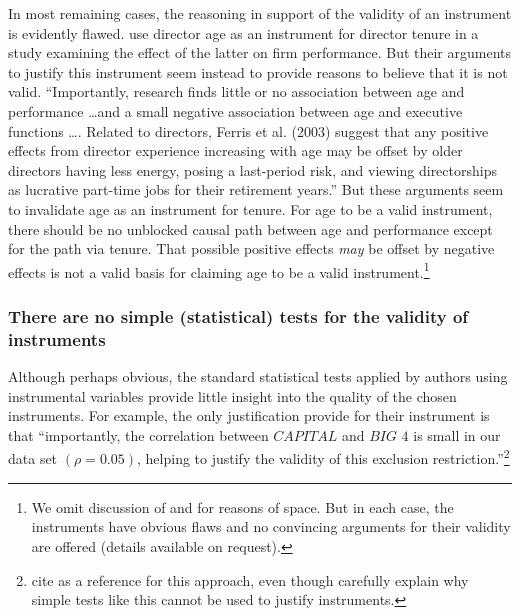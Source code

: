 \documentclass[11pt,reqno,titlepage]{amsart}
\begin{document}
\begin{doublespace}
In most remaining cases, the reasoning in support of the validity of an instrument is evidently flawed. \citet{Kim:2014fm} use director age as an instrument for director tenure in a study examining the effect of the latter on firm performance. 
But their arguments to justify this instrument seem instead to provide reasons to believe that it is not valid. 
``Importantly, research finds little or no association between age and performance \dots and a small negative association between age and executive functions \dots. 
Related to directors, Ferris et al. (2003) suggest that any positive effects from director experience increasing with age may be offset by older directors having less energy, posing a last-period risk, and viewing directorships as lucrative part-time jobs for their retirement years.'' 
But these arguments seem to invalidate age as an instrument for tenure. 
For age to be a valid instrument, there should be no unblocked causal path between age and performance except for the path via tenure.
That possible positive effects \emph{may} be offset by negative effects is not a valid basis for claiming age to be a valid instrument.\footnote{
We omit discussion of  \citet{Erkens:2014hj,Houston:2014hv} and \citet{deFranco:2014ct} for reasons of space. But in each case, the instruments have obvious flaws and no convincing arguments for their validity are offered (details available on request).}

\subsubsection{There are no simple (statistical) tests for the validity of instruments}
Although perhaps obvious, the standard statistical tests applied by authors using instrumental variables provide little insight into the quality of the chosen instruments. 
For example, the only justification \citet{Guedhami:2013cj} provide for their instrument is that ``importantly, the correlation between $\textit{CAPITAL}$ and $\textit{BIG 4}$ is small in our data set $(\rho = 0.05)$, helping to justify the validity of this exclusion restriction.''\footnote{
 \citet{Guedhami:2013cj} cite \citet{Larcker:2010fq} as a reference for this approach, even though \citet{Larcker:2010fq} carefully explain why simple tests like this cannot be used to justify instruments.}


\end{doublespace}
\end{document}
